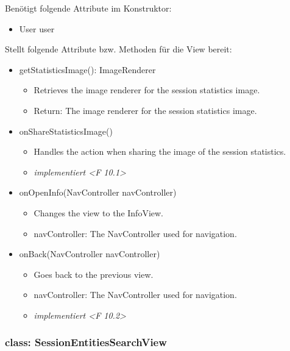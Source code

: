 \documentclass[oneside, ngerman]{sdqtechreport}
\begin{document}
Benötigt folgende Attribute im Konstruktor:
\begin{itemize}
    \item User user
\end{itemize}
Stellt folgende Attribute bzw. Methoden für die View bereit:
\begin{itemize}
    \item getStatisticsImage(): ImageRenderer
        \begin{itemize}
            \item Retrieves the image renderer for the session statistics image.
            \item Return: The image renderer for the session statistics image.
        \end{itemize}
    \item onShareStatisticsImage()
        \begin{itemize}
            \item Handles the action when sharing the image of the session statistics.
            \item \textit{implementiert <F 10.1>}
        \end{itemize}
    \item onOpenInfo(NavController navController)
        \begin{itemize}
            \item Changes the view to the InfoView.
            \item navController: The NavController used for navigation.
        \end{itemize}
    \item onBack(NavController navController)
        \begin{itemize}
            \item Goes back to the previous view.
            \item navController: The NavController used for navigation.
            \item \textit{implementiert <F 10.2>}
        \end{itemize}
\end{itemize}



\subsubsection{class: SessionEntitiesSearchView}
\end{document}
